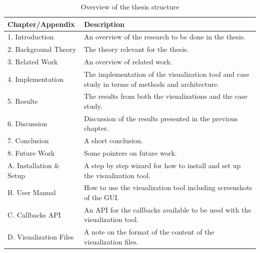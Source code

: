 \begin{table}[!h]
\begin{center}
\begin{tabular}{ | l | p{8cm} |}
\hline
\textbf{Chapter/Appendix} & \textbf{Description} \\ \hline
1. Introduction & An overview of the research to be done in the thesis. \\ \hline
2. Background Theory & The theory relevant for the thesis. \\ \hline
3. Related Work & An overview of related work. \\ \hline
4. Implementation & The implementation of the visualization tool and case study in terms of methods and architecture. \\ \hline
5. Results & The results from both the visualizations and the case study. \\ \hline
6. Discussion & Discussion of the results presented in the previous chapter. \\ \hline
7. Conclusion & A short conclusion. \\ \hline
8. Future Work & Some pointers on future work. \\ \hline
A. Installation \& Setup & A step by step wizard for how to install and set up the visualization tool. \\ \hline
B. User Manual & How to use the visualization tool including screenshots of the GUI. \\ \hline
C. Callbacks API & An API for the callbacks available to be used with the visualization tool. \\ \hline
D. Visualization Files & A note on the format of the content of the visualization files. \\ \hline
\end{tabular}
\end{center}
\caption{Overview of the thesis structure}
\label{tab:1}
\end{table}

\cleardoublepage
